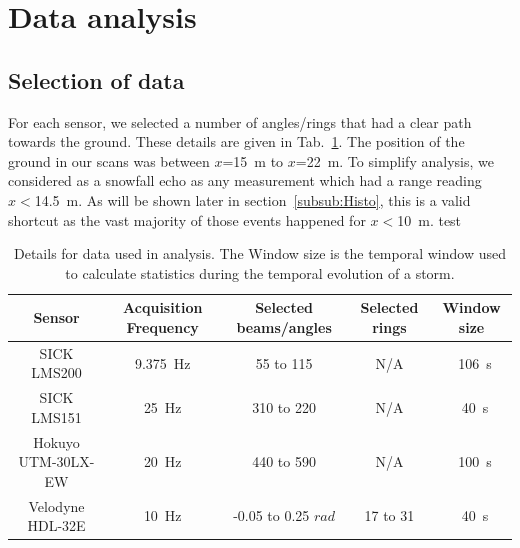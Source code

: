 \section{Data analysis}
\label{sec:data-analysis}

\subsection{Selection of data}
For each sensor, we selected a number of angles/rings that had a clear path towards the ground. These details are given in Tab.~\ref{tab:selectionScans}. The position of the ground in our scans was between $x$=\SI{15}{\meter} to $x$=\SI{22}{\meter}. To simplify analysis, we considered as a snowfall echo as any measurement which had a range reading $x<$\SI{14.5}{\meter}. As will be shown later in section~\ref{subsub:Histo}, this is a valid shortcut as the vast majority of those events happened for $x<$\SI{10}{\meter}. 
test

\begin{table}[htbp]
    \centering
    \begin{tabular}{|c|c|c|c|c|}
        \hline
        \textbf{Sensor}            & \textbf{Acquisition Frequency}  & \textbf{Selected beams/angles}  & \textbf{Selected rings}  & \textbf{Window size} \\\hline
        SICK LMS200               & \SI{9.375}{\Hz}                      & 55 to 115                                    & N/A                         & ~\SI{106}{\second}       \\\hline
        SICK LMS151               & \SI{25}{\Hz}                           & 310 to 220                                  & N/A                         & ~\SI{40}{\second}        \\\hline
        Hokuyo UTM-30LX-EW  & \SI{20}{\Hz}                          & 440 to 590                                  & N/A                         & ~\SI{100}{\second}     \\\hline
        Velodyne HDL-32E        & \SI{10}{\Hz}                          & -0.05 to 0.25 $rad$                     & 17 to 31                   & ~\SI{40}{\second}      \\\hline
    \end{tabular}
    \caption{Details for data used in analysis. The Window size is the temporal window used to calculate statistics during the temporal evolution of a storm.}
    \label{tab:selectionScans}
\end{table}

